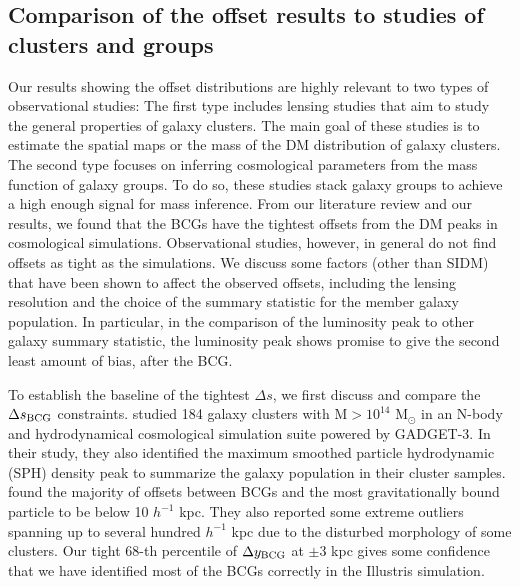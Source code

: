 \subsection{Comparison of the offset results to studies of clusters and groups}
\label{subsec:non_SIDM_offsets}
Our results showing the offset distributions are highly relevant to two types of
observational studies: 
The first type includes lensing studies that aim to study the general properties of 
galaxy clusters. The main goal of these studies is to estimate the spatial maps or 
the mass of the DM distribution of galaxy clusters. 
The second type focuses on inferring cosmological parameters from the 
mass function of galaxy groups. To do so, these studies stack galaxy 
groups to achieve a high enough signal for mass inference.
From our literature review and our results, we found that
the BCGs have the tightest offsets from the DM peaks in cosmological simulations. 
Observational studies, however, in general do not find offsets as tight as the 
simulations. We discuss some factors (other than SIDM) that 
have been shown to affect the observed offsets, including the lensing resolution and the
choice of the summary statistic for the member galaxy population. In particular, 
in the comparison of the luminosity peak to other galaxy summary statistic,
the luminosity peak shows promise to give the second least amount of bias,
after the BCG. 
 
To establish the baseline of the tightest $\Delta s$, we first discuss and 
compare the $\Delta s_{\rm BCG}$ constraints.   
\cite{Cui2015} studied 184 galaxy clusters with M$ > 10^{14}$ M$_\odot$ in an
N-body and hydrodynamical cosmological simulation suite powered by GADGET-3. 
In their study, they also identified the maximum smoothed particle hydrodynamic (SPH) density peak
to summarize 
the galaxy population in their cluster samples. \cite{Cui2015} found
the majority of offsets between BCGs and the most gravitationally bound particle to be
below 10 $h^{-1}$ kpc. They also reported some extreme outliers 
spanning up to several hundred $h^{-1}$ kpc due to the disturbed morphology of
some clusters. Our 
tight 68-th percentile of 
$\Delta y_{\rm BCG}$ at $ \pm 3$ kpc gives some confidence that 
we have identified most of the BCGs correctly in the Illustris simulation.

